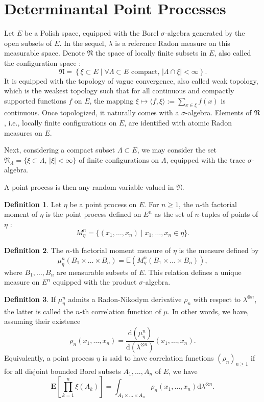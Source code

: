 \documentclass[11pt]{article}
\theoremstyle{plain}
\theoremstyle{definition}
\newtheorem{definition}{Definition}
\begin{document}
\section{Determinantal Point Processes}

Let $E$ be a Polish space, equipped with the Borel $\sigma$-algebra generated by the open subsets of $E$. In the sequel, $\lambda$ is a reference Radon measure on this measurable space. Denote $\mathfrak{N}$ the space of locally finite subsets in $E$, also called the configuration space : $$ \mathfrak{N} = \left\{ \xi \subset E \mid \forall \Lambda \subset E \text{ compact},\, |\Lambda \cap \xi| < \infty \right\}. $$ 
It is equipped with the topology of vague convergence, also called weak topology, which is the weakest topology such that for all continuous and compactly supported functions $f$ on $E$, the mapping $ \xi \mapsto \langle f, \xi \rangle := \sum\limits_{x \in \xi} f(x) $ is continuous.  Once topologized, it naturally comes with a $\sigma$-algebra. Elements of $ \mathfrak N$, i.e., locally finite configurations on $E$, are identified with atomic Radon measures on $E$.

Next, considering a compact subset $\Lambda \subset E$, we may consider the set $\mathfrak{N}_\Lambda = \{\xi \subset \Lambda,\, |\xi| < \infty\}$ of finite configurations on $\Lambda$, equipped with the trace $\sigma$-algebra.

A point process is then any random variable valued in $\mathfrak{N}$.

\begin{definition}
    Let $\eta$ be a point process on $E$. For $n \geq 1$, the $n$-th factorial moment of $\eta$ is the point process defined on $E^n$ as the set of $n$-tuples of points of $\eta$ :
    \[ 
        M_\eta^n = \{(x_1, \dots, x_n) \mid x_1, \dots, x_n \in \eta\}.
    \]
\end{definition}

\begin{definition}
    The $n$-th factorial moment measure of $\eta$ is the measure defined by
    \[ 
        \mu_\eta^n(B_1 \times \dots \times B_n) = \mathbb{E}(M_\eta^n(B_1 \times \dots \times B_n)),
    \]
    where $B_1, \dots, B_n$ are measurable subsets of $E$. This relation defines a unique measure on $E^n$ equipped with the product $\sigma$-algebra.
\end{definition}

\begin{definition}
    If $\mu_\eta^n$ admits a Radon-Nikodym derivative $\rho_n$ with respect to $\lambda^{\otimes n}$, the latter is called the $n$-th correlation function of $\mu$. In other words, we have, assuming their existence
    \[ 
        \rho_n(x_1, \dots, x_n) = \frac{\mathrm d (\mu_\eta^n )}{\mathrm d (\lambda^{\otimes n})}(x_1, \dots, x_n).
    \]
    Equivalently, a point process $\eta$ is said to have correlation functions $(\rho_n)_{n \geq 1}$ if for all disjoint bounded Borel subsets $A_1, \dots, A_n$ of $E$, we have
    \[
        \mathbf E \left[ \prod_{k=1}^{n} \xi(A_k) \right] = \int_{A_1 \times \dots \times A_n} \rho_n(x_1, \dots, x_n) \mathrm d\lambda^{\otimes n}.
    \]
\end{definition}
\end{document}
